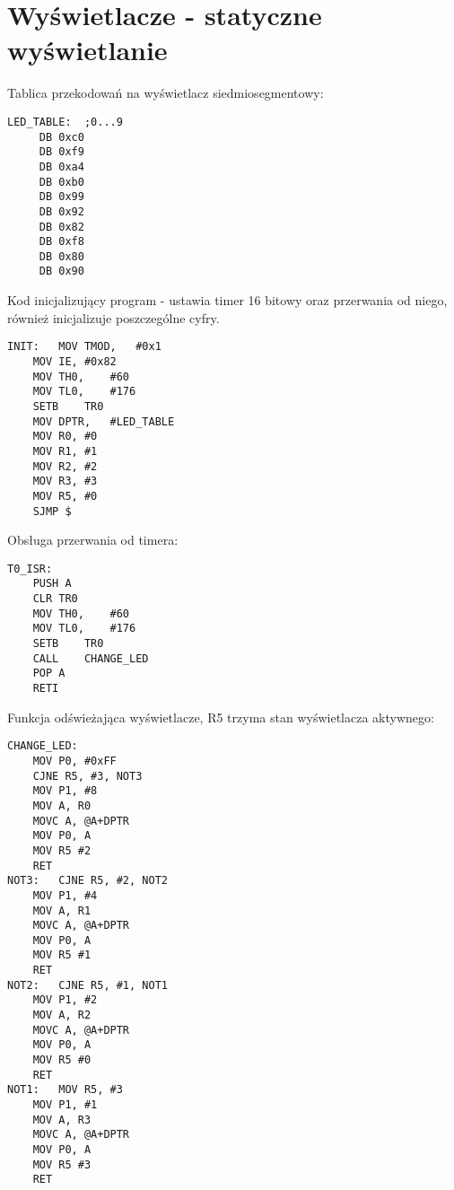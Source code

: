 \documentclass[a4paper, 12pt, titlepage]{article}
\begin{document}
	\section{Wyświetlacze - statyczne wyświetlanie}
	Tablica przekodowań na wyświetlacz siedmiosegmentowy:
\begin{lstlisting}
LED_TABLE:	;0...9
     DB 0xc0 
     DB 0xf9
     DB 0xa4
     DB 0xb0
     DB 0x99
     DB 0x92      
     DB 0x82
     DB 0xf8      
     DB 0x80      
     DB 0x90
\end{lstlisting}
	Kod inicjalizujący program - ustawia timer 16 bitowy oraz przerwania od niego, również inicjalizuje poszczególne cyfry.
\begin{lstlisting}
INIT:	MOV	TMOD,	#0x1
	MOV	IE,	#0x82
	MOV	TH0,	#60
	MOV	TL0,	#176
	SETB	TR0
	MOV	DPTR,	#LED_TABLE
	MOV	R0,	#0
	MOV	R1,	#1
	MOV	R2,	#2
	MOV	R3,	#3
	MOV R5, #0
	SJMP $
\end{lstlisting}
	Obsługa przerwania od timera:
\begin{lstlisting}
T0_ISR:    
	PUSH A
	CLR	TR0
	MOV	TH0,    #60
	MOV	TL0,    #176
	SETB	TR0
	CALL	CHANGE_LED
	POP A
	RETI
\end{lstlisting}
\newpage\noindent
Funkcja odświeżająca wyświetlacze, R5 trzyma stan wyświetlacza aktywnego:
\begin{lstlisting}
CHANGE_LED:
	MOV P0, #0xFF 
	CJNE R5, #3, NOT3
	MOV P1, #8
	MOV A, R0
	MOVC A, @A+DPTR
	MOV	P0, A
	MOV R5 #2
	RET
NOT3:	CJNE R5, #2, NOT2
	MOV P1, #4
	MOV A, R1
	MOVC A, @A+DPTR
	MOV	P0, A
	MOV R5 #1
	RET
NOT2:	CJNE R5, #1, NOT1
	MOV P1, #2
	MOV A, R2
	MOVC A, @A+DPTR
	MOV	P0, A
	MOV R5 #0
	RET
NOT1:	MOV R5, #3
	MOV P1, #1
	MOV A, R3
	MOVC A, @A+DPTR
	MOV	P0, A
	MOV R5 #3
	RET
\end{lstlisting}
\newpage\noindent
\end{document}
